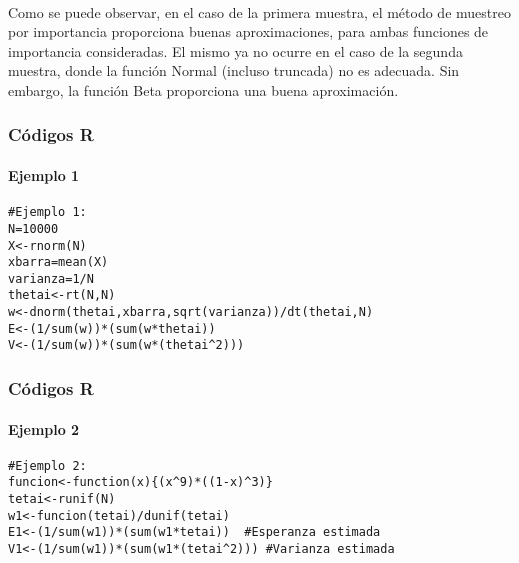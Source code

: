 \documentclass[12pt]{beamer}
\begin{document}
\begin{frame}
~\\Como se puede observar, en el caso de la primera muestra, el método de muestreo por importancia proporciona buenas aproximaciones, para ambas funciones de importancia consideradas.  El mismo ya no ocurre en el caso de la segunda muestra, donde la función Normal (incluso truncada) no es adecuada. Sin embargo, la función Beta proporciona una buena aproximación. 
\end{frame}

\begin{frame}[fragile]
\frametitle{Códigos R}
\framesubtitle{Ejemplo 1}
\begin{verbatim}
#Ejemplo 1:
N=10000
X<-rnorm(N)
xbarra=mean(X)
varianza=1/N
thetai<-rt(N,N)
w<-dnorm(thetai,xbarra,sqrt(varianza))/dt(thetai,N)
E<-(1/sum(w))*(sum(w*thetai))
V<-(1/sum(w))*(sum(w*(thetai^2)))
\end{verbatim}
\end{frame}

\begin{frame}[fragile]
\frametitle{Códigos R}
\framesubtitle{Ejemplo 2}
\begin{verbatim}
#Ejemplo 2:
funcion<-function(x){(x^9)*((1-x)^3)}
tetai<-runif(N)
w1<-funcion(tetai)/dunif(tetai)
E1<-(1/sum(w1))*(sum(w1*tetai))  #Esperanza estimada
V1<-(1/sum(w1))*(sum(w1*(tetai^2))) #Varianza estimada
\end{verbatim}
\end{frame}
\end{document}
